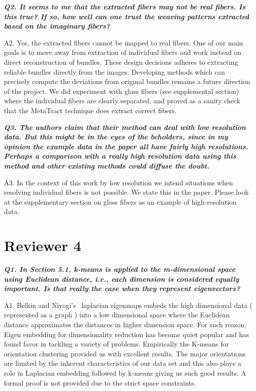 \documentclass[]{article}
\begin{document}
\makebox[\linewidth]{\rule{0.25\textwidth}{0.4pt}}


\textbf{\textit{
Q2. It seems to me that the extracted fibers may not be real fibers. Is this
true? If so, how well can one trust the weaving patterns extracted based
on the imaginary fibers?
}}


A2. Yes, the extracted fibers cannot be mapped to real fibers. One of our main goals is to move away from extraction of individual fibers and work instead on direct reconstruction of bundles. These design decisions adheres to extracting reliable bundles directly from the images.
Developing methods which can precisely compute the deviations from original bundles remains a future direction of the project. We did experiment with glass fibers (see supplemental section) where the individual fibers are clearly separated, and proved as a sanity check that the MetaTract technique does extract correct fibers.
 
\makebox[\linewidth]{\rule{0.25\textwidth}{0.4pt}}


\textbf{\textit{
Q3. The authors claim that their method can deal with low resolution data.
But this might be in the eyes of the beholders, since in my opinion the example data in the paper all have fairly high resolutions. Perhaps a comparison with a really high resolution data using this method and other existing methods could diffuse the doubt.
}}


A3. In the context of this work by low resolution we intend situations when resolving individual fibers is not possible. We state this in the paper. Please look at the supplementary section on glass fibers as an example of high-resolution data.

\makebox[\linewidth]{\rule{0.25\textwidth}{0.4pt}}

\section{Reviewer 4}

\textbf{\textit{
Q1. In Section 5.1, k-means is applied to the m-dimensional space using
Euclidean distance, i.e., each dimension is considered equally important.
Is that really the case when they represent eigenvectors?
}}


A1. Belkin  and Niyogi's~\cite{Belkin01} laplacian eigenmaps embeds the high dimensional data ( represented as a graph ) into a low dimensional space where the Euclidean distance approximates the distances in higher dimension space. For such reason, Eigen embedding for dimensionality reduction has become quiet popular and has found favor in tackling a variety of problems. Empirically the K-means for orientation clustering provided us with excellent results. The major orientations are limited by the inherent characteristics of our data set and this also plays a role in Laplacian embedding followed by k-means giving us such good results. A formal proof is not provided due to the strict space constraints.
 
\end{document}
